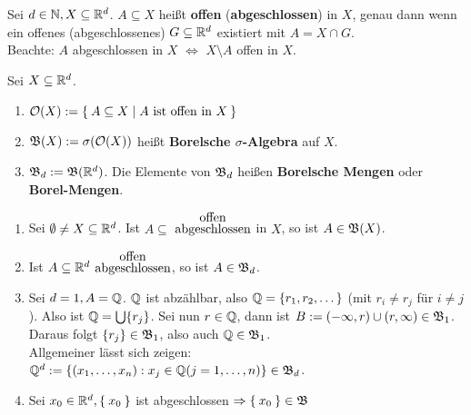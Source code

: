 \begin{erinnerung}
    Sei $d\in\mathbb{N}, X\subseteq\mathbb{R}^d$. $A\subseteq X$ heißt 
    \textbf{offen} (\textbf{abgeschlossen}) in $X$, genau dann wenn 
    ein offenes (abgeschlossenes) $G\subseteq\mathbb{R}^d$ existiert mit 
    $A=X\cap G$.\\
    Beachte: $A$ abgeschlossen in $X$ $\iff$ $X\setminus A$ offen in 
    $X$.
\end{erinnerung}

\begin{definition}
    Sei $X\subseteq\mathbb{R}^d$.
    \begin{enumerate}
        \item $\mathcal{O}(X):=\Set{A\subseteq X | A \text{ ist offen in } X}$
        \item $\mathfrak{B}(X):=\sigma(\mathcal{O}(X))$ heißt 
              \textbf{Borelsche $\sigma$-Algebra} auf $X$.
        \item $\mathfrak{B}_d:=\mathfrak{B}(\mathbb{R}^d)$. Die Elemente von $\mathfrak{B}_d$ heißen 
              \textbf{Borelsche Mengen} oder \textbf{Borel-Mengen}.
    \end{enumerate}
\end{definition}

\begin{beispiel}
    \begin{enumerate}
        \item Sei $\emptyset \neq X\subseteq\mathbb{R}^d$. Ist $A\subseteq$ 
              $\stackrel{\hbox{offen}}{\hbox{abgeschlossen}}$
              in $X$, so ist $A\in\mathfrak{B}(X)$.
        \item Ist $A\subseteq\mathbb{R}^d$ 
              $\stackrel{\hbox{offen}}{\hbox{abgeschlossen}}$,
              so ist $A\in\mathfrak{B}_d$.
        \item Sei $d=1, A=\mathbb{Q}$. $\mathbb{Q}$ ist abzählbar, also 
              $\mathbb{Q}=\{r_1,r_2,\dots\}$ (mit $r_i\ne r_j$ für $i\ne j$). 
              Also ist $\mathbb{Q}=\bigcup \{r_j\}$. Sei nun $r\in\mathbb{Q}$, 
              dann ist $B:=(-\infty,r)\cup(r,\infty)\in\mathfrak{B}_1$. Daraus 
              folgt $\{r_j\}\in\mathfrak{B}_1$, also auch $\mathbb{Q}\in\mathfrak{B}_1$.\\
              Allgemeiner lässt sich zeigen: 
              $\mathbb{Q}^d:=\{(x_1,\dots,x_n):x_j\in\mathbb{Q} (j=1,\dots,n)\}\in\mathfrak{B}_d$.
        \item Sei $x_0 \in \mathbb{R}^d, \Set{x_0}$ ist abgeschlossen
              $\Rightarrow \Set{x_0} \in \mathfrak{B}$
    \end{enumerate}
\end{beispiel}

